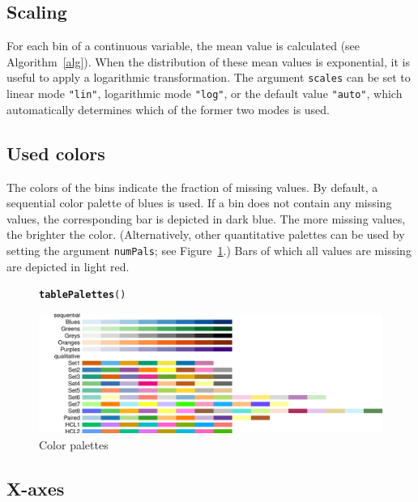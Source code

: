 \documentclass[11pt, fleqn, a4paper]{article}\usepackage[]{graphicx}\usepackage[]{color}
\makeatletter
\def\maxwidth{ %
  \ifdim\Gin@nat@width>\linewidth
    \linewidth
  \else
    \Gin@nat@width
  \fi
}
\newcommand{\hlstd}[1]{\textcolor[rgb]{0.345,0.345,0.345}{#1}}%
\newcommand{\hlkwd}[1]{\textcolor[rgb]{0.737,0.353,0.396}{\textbf{#1}}}%
\newenvironment{kframe}{%
 \def\at@end@of@kframe{}%
 \ifinner\ifhmode%
  \def\at@end@of@kframe{\end{minipage}}%
  \begin{minipage}{\columnwidth}%
 \fi\fi%
 \def\FrameCommand##1{\hskip\@totalleftmargin \hskip-\fboxsep
 \colorbox{shadecolor}{##1}\hskip-\fboxsep
     \hskip-\linewidth \hskip-\@totalleftmargin \hskip\columnwidth}%
 \MakeFramed {\advance\hsize-\width
   \@totalleftmargin\z@ \linewidth\hsize
   \@setminipage}}%
 {\par\unskip\endMakeFramed%
 \at@end@of@kframe}
\newenvironment{knitrout}{}{} %
\makeatother
\begin{document}
\subsection{Scaling}
For each bin of a continuous variable, the mean value is calculated (see Algorithm~\ref{alg}).
When the distribution of these mean values is exponential, it is useful to apply a logarithmic transformation. The argument {\tt scales} can be set to linear mode {\tt "lin"}, logarithmic mode {\tt "log"}, or the default value {\tt "auto"}, which automatically determines which of the former two modes is used.

\subsection{Used colors}
The colors of the bins indicate the fraction of missing values. By default, a sequential color palette of blues is used. If a bin does not contain any missing values, the corresponding bar is depicted in dark blue. The more missing values, the brighter the color. (Alternatively, other quantitative palettes can be used by setting the argument {\tt numPals}; see Figure~\ref{fig:pals}.) Bars of which all values are missing are depicted in light red.

\begin{figure}[htp]
\begin{knitrout}
\color{fgcolor}\begin{kframe}
\begin{alltt}
\hlkwd{tablePalettes}\hlstd{()}
\end{alltt}
\end{kframe}
\includegraphics[width=\maxwidth]{figure/chunk6} 

\end{knitrout}

\caption{Color palettes}
\label{fig:pals}
\end{figure}


\subsection{X-axes}
\end{document}
